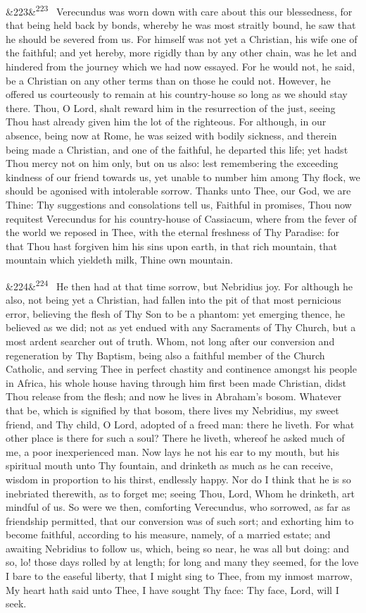 \documentclass[12pt]{article}
\newcommand{\para}[1][]{\par\noindent\ifx&#1&\else\textsuperscript{\footnotesize #1}~\fi}
\begin{document}
\para[223] Verecundus was worn down with care about this our blessedness, for that being held back by bonds, whereby he was most straitly bound, he saw that he should be severed from us. For himself was not yet a Christian, his wife one of the faithful; and yet hereby, more rigidly than by any other chain, was he let and hindered from the journey which we had now essayed. For he would not, he said, be a Christian on any other terms than on those he could not. However, he offered us courteously to remain at his country-house so long as we should stay there. Thou, O Lord, shalt reward him in the resurrection of the just, seeing Thou hast already given him the lot of the righteous. For although, in our absence, being now at Rome, he was seized with bodily sickness, and therein being made a Christian, and one of the faithful, he departed this life; yet hadst Thou mercy not on him only, but on us also: lest remembering the exceeding kindness of our friend towards us, yet unable to number him among Thy flock, we should be agonised with intolerable sorrow. Thanks unto Thee, our God, we are Thine: Thy suggestions and consolations tell us, Faithful in promises, Thou now requitest Verecundus for his country-house of Cassiacum, where from the fever of the world we reposed in Thee, with the eternal freshness of Thy Paradise: for that Thou hast forgiven him his sins upon earth, in that rich mountain, that mountain which yieldeth milk, Thine own mountain.

\para[224] He then had at that time sorrow, but Nebridius joy. For although he also, not being yet a Christian, had fallen into the pit of that most pernicious error, believing the flesh of Thy Son to be a phantom: yet emerging thence, he believed as we did; not as yet endued with any Sacraments of Thy Church, but a most ardent searcher out of truth. Whom, not long after our conversion and regeneration by Thy Baptism, being also a faithful member of the Church Catholic, and serving Thee in perfect chastity and continence amongst his people in Africa, his whole house having through him first been made Christian, didst Thou release from the flesh; and now he lives in Abraham's bosom. Whatever that be, which is signified by that bosom, there lives my Nebridius, my sweet friend, and Thy child, O Lord, adopted of a freed man: there he liveth. For what other place is there for such a soul? There he liveth, whereof he asked much of me, a poor inexperienced man. Now lays he not his ear to my mouth, but his spiritual mouth unto Thy fountain, and drinketh as much as he can receive, wisdom in proportion to his thirst, endlessly happy. Nor do I think that he is so inebriated therewith, as to forget me; seeing Thou, Lord, Whom he drinketh, art mindful of us. So were we then, comforting Verecundus, who sorrowed, as far as friendship permitted, that our conversion was of such sort; and exhorting him to become faithful, according to his measure, namely, of a married estate; and awaiting Nebridius to follow us, which, being so near, he was all but doing: and so, lo! those days rolled by at length; for long and many they seemed, for the love I bare to the easeful liberty, that I might sing to Thee, from my inmost marrow, My heart hath said unto Thee, I have sought Thy face: Thy face, Lord, will I seek.
\end{document}
